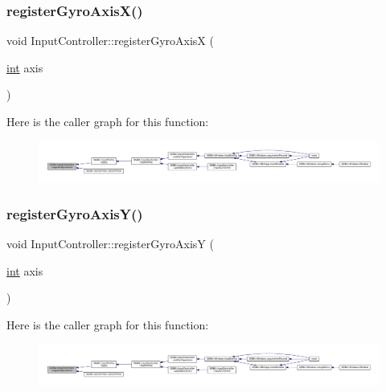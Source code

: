 \subsubsection{\texorpdfstring{register\+Gyro\+Axis\+X()}{registerGyroAxisX()}}
{\footnotesize\ttfamily void Input\+Controller\+::register\+Gyro\+AxisX (\begin{DoxyParamCaption}\item[{\mbox{\hyperlink{ioapi_8h_a787fa3cf048117ba7123753c1e74fcd6}{int}}}]{axis }\end{DoxyParamCaption})}

Here is the caller graph for this function\+:
\nopagebreak
\begin{figure}[H]
\begin{center}
\leavevmode
\includegraphics[width=350pt]{class_q_g_b_a_1_1_input_controller_a99f4ccb37018985d45dcf79204cd3131_icgraph}
\end{center}
\end{figure}
\mbox{\label{class_q_g_b_a_1_1_input_controller_adc9962bbbe805ca7bfe72d73c39e4080}} 
\subsubsection{\texorpdfstring{register\+Gyro\+Axis\+Y()}{registerGyroAxisY()}}
{\footnotesize\ttfamily void Input\+Controller\+::register\+Gyro\+AxisY (\begin{DoxyParamCaption}\item[{\mbox{\hyperlink{ioapi_8h_a787fa3cf048117ba7123753c1e74fcd6}{int}}}]{axis }\end{DoxyParamCaption})}

Here is the caller graph for this function\+:
\nopagebreak
\begin{figure}[H]
\begin{center}
\leavevmode
\includegraphics[width=350pt]{class_q_g_b_a_1_1_input_controller_adc9962bbbe805ca7bfe72d73c39e4080_icgraph}
\end{center}
\end{figure}
\mbox{\label{class_q_g_b_a_1_1_input_controller_a0938dad12d333efcc9c3e310c0abbea2}} 
